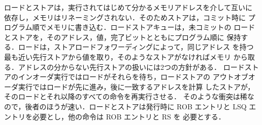 \documentclass[../main.tex]{subfiles}
\begin{document}
\begin{keypoint}[章のまとめ]
  ロードとストアは，実行されてはじめて分かるメモリアドレスを介して互いに
  依存し，メモリはリネーミングされない．そのためストアは，コミット時に
  プログラム順でメモリに書き込む．ロードストアキューは，未コミットの
  ロードとストアを，そのアドレス，値，完了ビットとともにプログラム順に
  保持する．ロードは，ストアロードフォワーディングによって，同じアドレス
  を持つ最も近い先行ストアから値を取り，そのようなストアがなければメモリ
  から取る．アドレスの分からない先行ストアの扱いには2つの方針がある．
  ロードストアのインオーダ実行ではロードがそれらを待ち，ロードストアの
  アウトオブオーダ実行ではロードが先に進み，後に一致するアドレスを計算
  したストアが，そのロードとそれ以降のすべての命令を再実行させる．
  そのような衝突は稀なので，後者のほうが速い．ロードとストアは発行時に
  ROB エントリと LSQ エントリを必要とし，他の命令は ROB エントリと RS を
  必要とする．
\end{keypoint}
\end{document}
